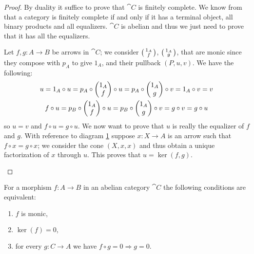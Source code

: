 \begin{proof}
  By duality it suffice to prove that \(\cat{C}\) is finitely complete. We know from  \cite[Proposition 2.8.2]{handbook1} that a category is finitely complete if and only if it has a terminal object, all binary products and all equalizers. \(\cat{C}\) is abelian and thus we just need to prove that it has all the equalizers.

  Let \(f,g:A\to B\) be arrows in \(\cat{C}\); we consider \(\left(\begin{smallmatrix}1_A\\ f\end{smallmatrix}\right)\), \(\left(\begin{smallmatrix}1_A\\ g\end{smallmatrix}\right)\), that are monic since they compose with \(p_A\) to give \(1_A\), and their pullback \((P, u, v)\). We have the following:
  \begin{gather*}
    u = 1_A\circ u = p_A\circ\begin{pmatrix}1_A\\ f\end{pmatrix}\circ u = p_A\circ\begin{pmatrix}1_A\\ g\end{pmatrix}\circ v = 1_A\circ v = v\\
    f\circ u = p_B\circ\begin{pmatrix}1_A\\ f\end{pmatrix}\circ u = p_B\circ\begin{pmatrix}1_A\\ g\end{pmatrix}\circ v = g\circ v = g\circ u
  \end{gather*}
  so \(u = v\) and \(f\circ u =g\circ u\). We now want to prove that \(u\) is really the equalizer of \(f\) and \(g\). With reference to diagram \ref{diagram:equalizers} suppose \(x:X\to A\) is an arrow such that \(f\circ x = g\circ x\); we consider the cone \((X,x,x)\) and thus obtain a unique factorization of \(x\) through \(u\). This proves that \(u=\ker(f, g)\).
  \begin{figure}[h]
    
    \caption{}
    \label{diagram:equalizers}
  \end{figure}
\end{proof}

\begin{proposition}
  \label{prop:mono_characterization}
  For a morphism \(f\colon A\to B\) in an abelian category \(\cat{C}\) the following conditions are equivalent:
  \begin{enumerate}[label=(\arabic*)]
  \item \(f\) is monic,
  \item \(\ker(f)=0\),
  \item for every \(g:C\to A\) we have \(f\circ g = 0\Rightarrow g = 0\).
  \end{enumerate}
\end{proposition}

